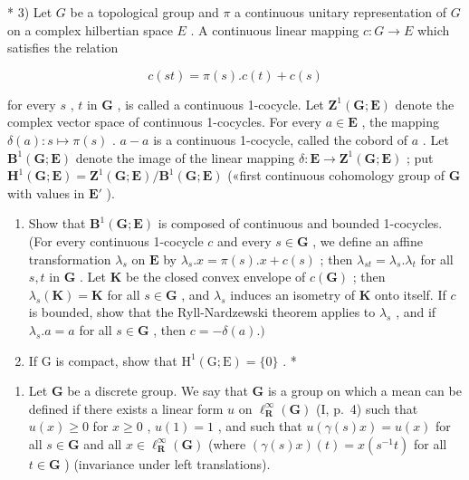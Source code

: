 * 3) Let \(G\) be a topological group and \(\pi\) a continuous unitary representation of \(G\) on a complex hilbertian space \(E\) . A continuous linear mapping \(c: G \to E\) which satisfies the relation

\[
c (s t) = \pi (s). c (t) + c (s)
\]

for every \(s\) , \(t\) in \(\mathbf{G}\) , is called a continuous 1-cocycle. Let \(\mathbf{Z}^{1}(\mathbf{G};\mathbf{E})\) denote the complex vector space of continuous 1-cocycles. For every \(a\in\mathbf{E}\) , the mapping \(\delta(a):s\mapsto\pi(s)\) . \(a-a\) is a continuous 1-cocycle, called the cobord of \(a\) . Let \(\mathbf{B}^{1}(\mathbf{G};\mathbf{E})\) denote the image of the linear mapping \(\delta:\mathbf{E}\to\mathbf{Z}^{1}(\mathbf{G};\mathbf{E})\) ; put \(\mathbf{H}^{1}(\mathbf{G};\mathbf{E})=\mathbf{Z}^{1}(\mathbf{G};\mathbf{E})/\mathbf{B}^{1}(\mathbf{G};\mathbf{E})\) («first continuous cohomology group of \(\mathbf{G}\) with values in \(\mathbf{E}'\) ).

\begin{enumerate}
\def\labelenumi{\alph{enumi})}
\item
  Show that \(\mathbf{B}^1 (\mathbf{G};\mathbf{E})\) is composed of continuous and bounded 1-cocycles. (For every continuous 1-cocycle \(c\) and every \(s\in \mathbf{G}\) , we define an affine transformation \(\lambda_{s}\) on \(\mathbf{E}\) by \(\lambda_{s}.x = \pi (s).x + c(s)\) ; then \(\lambda_{st} = \lambda_s.\lambda_t\) for all \(s,t\) in \(\mathbf{G}\) . Let \(\mathbf{K}\) be the closed convex envelope of \(c(\mathbf{G})\) ; then \(\lambda_s(\mathbf{K}) = \mathbf{K}\) for all \(s\in \mathbf{G}\) , and \(\lambda_{s}\) induces an isometry of \(\mathbf{K}\) onto itself. If \(c\) is bounded, show that the Ryll-Nardzewski theorem applies to \(\lambda_{s}\) , and if \(\lambda_{s}.a = a\) for all \(s\in \mathbf{G}\) , then \(c = -\delta (a).)\)
\item
  If G is compact, show that \(\mathrm{H}^1 (\mathrm{G};\mathrm{E}) = \{0\}\) . *
\end{enumerate}

\begin{enumerate}
\def\labelenumi{\arabic{enumi})}
\setcounter{enumi}{3}
\tightlist
\item
  Let \(\mathbf{G}\) be a discrete group. We say that \(\mathbf{G}\) is a group on which a mean can be defined if there exists a linear form \(u\) on \(\ell_{\mathbf{R}}^{\infty}(\mathbf{G})\) (I, p.~4) such that \(u(x) \geqslant 0\) for \(x \geqslant 0\) , \(u(1) = 1\) , and such that \(u(\gamma(s)x) = u(x)\) for all \(s \in \mathbf{G}\) and all \(x \in \ell_{\mathbf{R}}^{\infty}(\mathbf{G})\) (where \((\gamma(s)x)(t) = x(s^{-1}t)\) for all \(t \in \mathbf{G}\) ) (invariance under left translations).
\end{enumerate}

